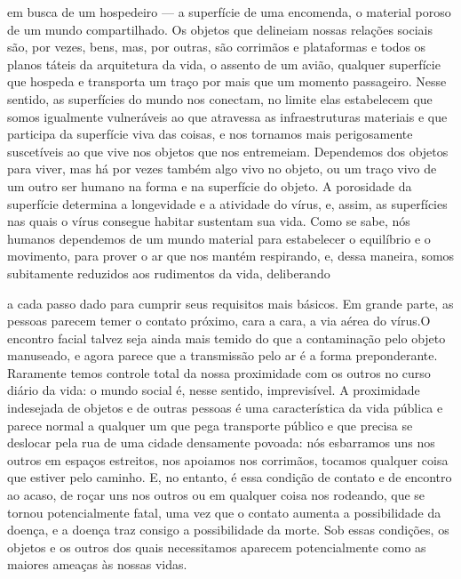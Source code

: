 \begin{multicols}{2}
em busca de um hospedeiro --- a superfície de uma encomenda, o material
poroso de um mundo compartilhado. Os objetos que delineiam nossas
relações sociais são, por vezes, bens, mas, por outras, são corrimãos e
plataformas e todos os planos táteis da arquitetura da vida, o assento
de um avião, qualquer superfície que hospeda e transporta um traço por
mais que um momento passageiro. Nesse sentido, as superfícies do mundo
nos conectam, no limite elas estabelecem que somos igualmente
vulneráveis ao que atravessa as infraestruturas materiais e que
participa da superfície viva das coisas, e nos tornamos mais
perigosamente suscetíveis ao que vive nos objetos que nos entremeiam.
Dependemos dos objetos para viver, mas há por vezes também algo vivo no
objeto, ou um traço vivo de um outro ser humano na forma e na superfície
do objeto. A porosidade da superfície determina a longevidade e a
atividade do vírus, e, assim, as superfícies nas quais o vírus consegue
habitar sustentam sua vida. Como se sabe, nós humanos dependemos de um
mundo material para estabelecer o equilíbrio e o movimento, para prover
o ar que nos mantém respirando, e, dessa maneira, somos subitamente reduzidos  aos rudimentos da vida, deliberando

\bigskip

{}

\bigskip

\noindent{}a cada passo dado para
cumprir seus requisitos mais básicos. Em grande parte, as pessoas
parecem temer o contato próximo, cara a cara, a via aérea do vírus.O
encontro facial talvez seja ainda mais temido do que a contaminação pelo
objeto manuseado, e agora parece que a transmissão pelo ar é a forma
preponderante. Raramente temos controle total da nossa proximidade com
os outros no curso diário da vida: o mundo social é, nesse sentido,
imprevisível. A proximidade indesejada de objetos e de outras pessoas é
uma característica da vida pública e parece normal a qualquer um que
pega transporte público e que precisa se deslocar pela rua de uma cidade
densamente povoada: nós esbarramos uns nos outros em espaços estreitos,
nos apoiamos nos corrimãos, tocamos qualquer coisa que estiver pelo
caminho. E, no entanto, é essa condição de contato e de encontro ao
acaso, de roçar uns nos outros ou em qualquer coisa nos rodeando, que se
tornou potencialmente fatal, uma vez que o contato aumenta a
possibilidade da doença, e a doença traz consigo a possibilidade da
morte. Sob essas condições, os objetos e os outros dos quais
necessitamos aparecem potencialmente como as maiores ameaças às nossas
vidas.


\end{multicols}
